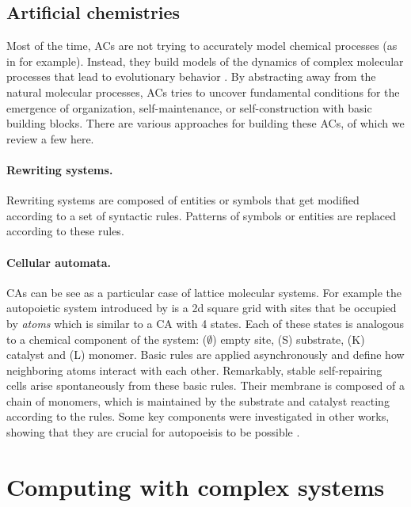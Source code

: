 \subsection{Artificial chemistries}
Most of the time, \acp{AC} are not trying to accurately model chemical processes
(as in \parencite{ostrovskyCellularAutomataPolymer2001} for example). Instead,
they build models of the dynamics of complex molecular processes that lead to
evolutionary behavior \parencite{dittrichArtificialChemistriesReview2001}. By
abstracting away from the natural molecular processes, \acp{AC} tries to uncover
fundamental conditions for the emergence of organization, self-maintenance, or
self-construction with basic building blocks. There are various approaches for
building these \aclp{AC}, of which we review a few here.

\paragraph{Rewriting systems.}
Rewriting systems are composed of entities or symbols that get modified
according to a set of syntactic rules. Patterns of symbols or entities are
replaced according to these rules.

\paragraph{Cellular automata.}
\Acfp{CA} can be see as a particular case of lattice molecular systems. For
example the autopoietic system introduced by
\cite{varelaAutopoiesisOrganizationLiving1991} is a 2d square grid with sites
that be occupied by \emph{atoms} which is similar to a \ac{CA} with 4 states.
Each of these states is analogous to a chemical component of the system: ($\emptyset$)
empty site, (S) substrate, (K) catalyst and (L) monomer. Basic rules are applied
asynchronously and define how neighboring atoms interact with each other.
Remarkably, stable self-repairing cells arise spontaneously from these basic
rules. Their membrane is composed of a chain of monomers, which is maintained by
the substrate and catalyst reacting according to the rules. Some key components
were investigated in other works, showing that they are crucial for autopoeisis
to be possible \parencite{zelenySelforganizationLivingSystems1977,
  mcmullinRediscoveringComputationalAutopoiesis1997}.

\section{Computing with complex systems}


